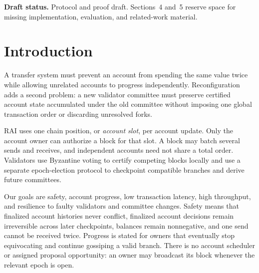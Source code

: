 \documentclass[10pt,twocolumn]{article}
\begin{document}
\begin{abstract}
At an epoch boundary, validators stop issuing old-epoch account votes and sign compact reports. Reports commit to certified account state and to the reporter's own residual signed votes not yet summarized by that state. Reconciliation is state based: a requester names a locally available source root and a historical target root, and a replica that knows both returns a reconstructive authenticated difference containing the state edits and hash material needed to recover the target. The requester accepts the reconstruction only if recomputing the certified-state hash yields the signed target root; there is no separate reconciliation-proof object. A joint epoch election under the old and new committees decides the checkpoint ledger and its finalized application projection. The epoch proposal carries selected report roots and only a hash of the deterministically derived state. We give safety arguments and separate progress conditions for account updates, reconciliation, and epoch closure. Implementation and experimental results are reserved for an RsNano-based comparison; no performance results are claimed in this draft.
\end{abstract}

\noindent\textbf{Draft status.} Protocol and proof draft. Sections~4 and~5 reserve space for missing implementation, evaluation, and related-work material.

\section{Introduction}
A transfer system must prevent an account from spending the same value twice while allowing unrelated accounts to progress independently. Reconfiguration adds a second problem: a new validator committee must preserve certified account state accumulated under the old committee without imposing one global transaction order or discarding unresolved forks.

RAI uses one chain position, or \emph{account slot}, per account update. Only the account owner can authorize a block for that slot. A block may batch several sends and receives, and independent accounts need not share a total order. Validators use Byzantine voting to certify competing blocks locally and use a separate epoch-election protocol to checkpoint compatible branches and derive future committees.

Our goals are safety, account progress, low transaction latency, high throughput, and resilience to faulty validators and committee changes. Safety means that finalized account histories never conflict, finalized account decisions remain irreversible across later checkpoints, balances remain nonnegative, and one send cannot be received twice. Progress is stated for owners that eventually stop equivocating and continue gossiping a valid branch. There is no account scheduler or assigned proposal opportunity: an owner may broadcast its block whenever the relevant epoch is open.
\end{document}
